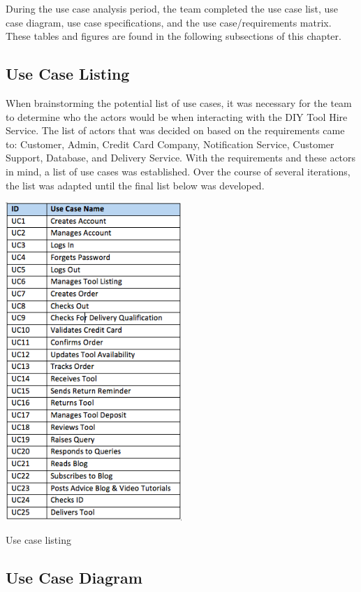 During the use case analysis period, the team completed the use case
list, use case diagram, use case specifications, and the use
case/requirements matrix. These tables and figures are found in the
following subsections of this chapter.

\hypertarget{use-case-listing}{%
\subsection{Use Case Listing}\label{use-case-listing}}

When brainstorming the potential list of use cases, it was necessary for
the team to determine who the actors would be when interacting with the
DIY Tool Hire Service. The list of actors that was decided on based on
the requirements came to: Customer, Admin, Credit Card Company,
Notification Service, Customer Support, Database, and Delivery Service.
With the requirements and these actors in mind, a list of use cases was
established. Over the course of several iterations, the list was adapted
until the final list below was developed.

\begin{table}[H]
      \centering
      \includegraphics[trim = 0 0 0 0, clip, width=0.5\textwidth]{TempImg/UCListing.png}
      \caption{Use case listing}
 \end{table}

\hypertarget{use-case-diagram}{%
\subsection{Use Case Diagram}\label{use-case-diagram}}

